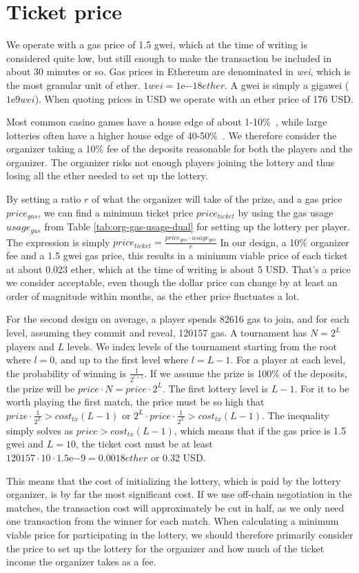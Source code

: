 \section{Ticket price}
\label{sec:ticket-price}

We operate with a gas price of 1.5 gwei, which at the time of writing is considered quite low, but still enough to make the transaction be included in about 30 minutes or so. Gas prices in Ethereum are denominated in \emph{wei}, which is the most granular unit of ether. $1 wei=1 \mathrm{e}{-18} ether$. A gwei is simply a gigawei ($1\mathrm{e}{9} wei$). When quoting prices in USD we operate with an ether price of 176 USD. 

Most common casino games have a house edge of about 1-10\%~\cite{walsh_houses_nodate}, while large lotteries often have a higher house edge of 40-50\%~\cite{shackleford_house_nodate}. We therefore consider the organizer taking a 10\% fee of the deposits reasonable for both the players and the organizer. The organizer risks not enough players joining the lottery and thus losing all the ether needed to set up the lottery. 

By setting a ratio $r$ of what the organizer will take of the prize, and a gas price $price_{gas}$, we can find a minimum ticket price $price_{ticket}$ by using the gas usage $usage_{gas}$ from Table \ref{tab:org-gas-usage-dual} for setting up the lottery per player. The expression is simply $price_{ticket}=\frac{price_{gas} \cdot usage_{gas}}{r}$
In our design, a 10\% organizer fee and a 1.5 gwei gas price, this results in a minimum viable price of each ticket at about 0.023 ether, which at the time of writing is about 5 USD. That's a price we consider acceptable, even though the dollar price can change by at least an order of magnitude within months, as the ether price fluctuates a lot. 

For the second design on average, a player spends 82616 gas to join, and for each level, assuming they commit and reveal, 120157 gas. A tournament has $N=2^L$ players and $L$ levels. We index levels of the tournament starting from the root where $l=0$, and up to the first level where $l=L-1$. For a player at each level, the probability of winning is $\frac{1}{2^{l+1}}$. If we assume the prize is 100\% of the deposits, the prize will be $price \cdot N=price \cdot 2^L$. The first lottery level is $L-1$. For it to be worth playing the first match, the price must be so high that $prize \cdot \frac{1}{2^L} > cost_{tx}(L-1)$ or $2^L \cdot price \cdot \frac{1}{2^L} > cost_{tx}(L-1)$. The inequality simply solves as $price > cost_{tx}(L-1)$, which means that if the gas price is 1.5 gwei and $L=10$, the ticket cost must be at least $120157 \cdot 10 \cdot 1.5 \mathrm{e}{-9}=0.0018 ether$ or 0.32 USD. 

This means that the cost of initializing the lottery, which is paid by the lottery organizer, is by far the most significant cost. If we use off-chain negotiation in the matches, the transaction cost will approximately be cut in half, as we only need one transaction from the winner for each match. When calculating a minimum viable price for participating in the lottery, we should therefore primarily consider the price to set up the lottery for the organizer and how much of the ticket income the organizer takes as a fee.
